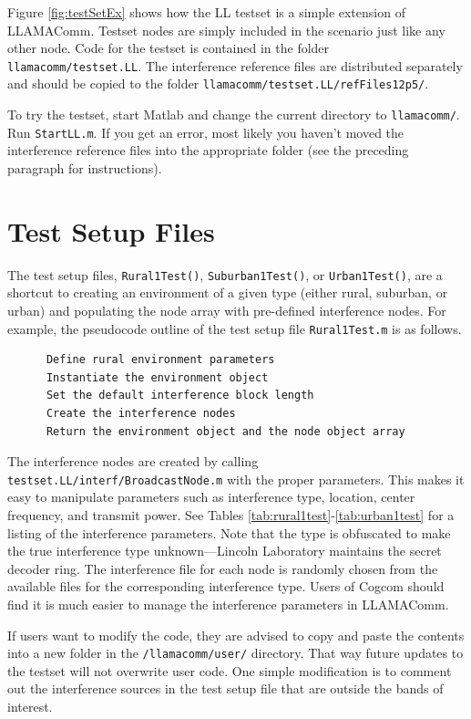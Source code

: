 Figure \ref{fig:testSetEx} shows how the LL testset is a simple
extension of LLAMAComm.  Testset nodes are simply included in the
scenario just like any other node.  Code for the testset is
contained in the folder \verb+llamacomm/testset.LL+. The
interference reference files are distributed separately and should
be copied to the folder \verb+llamacomm/testset.LL/refFiles12p5/+.

To try the testset, start Matlab and change the current directory to
\verb+llamacomm/+.  Run \verb+StartLL.m+.  If you get an error, most
likely you haven't moved the interference reference files into the
appropriate folder (see the preceding paragraph for instructions).

\section{Test Setup Files}
The test setup files, \verb+Rural1Test()+, \verb+Suburban1Test()+, or
\verb+Urban1Test()+, are a shortcut to creating an environment of a given type
(either rural, suburban, or urban) and populating the node array with
pre-defined interference nodes.  For example, the pseudocode outline of the
test setup file \verb+Rural1Test.m+ is as follows.

\begin{verbatim}
      Define rural environment parameters
      Instantiate the environment object
      Set the default interference block length
      Create the interference nodes
      Return the environment object and the node object array
\end{verbatim}

The interference nodes are created by calling
\verb+testset.LL/interf/BroadcastNode.m+ with the proper parameters.
This makes it easy to manipulate parameters such as interference
type, location, center frequency, and transmit power. See Tables
\ref{tab:rural1test}-\ref{tab:urban1test} for a listing of the
interference parameters.  Note that the type is obfuscated to make
the true interference type unknown---Lincoln Laboratory maintains
the secret decoder ring.  The interference file for each node is
randomly chosen from the available files for the corresponding
interference type.  Users of Cogcom should find it is much easier to
manage the interference parameters in LLAMAComm.

If users want to modify the code, they are advised to copy and paste the
contents into a new folder in the \verb+/llamacomm/user/+ directory.  That way
future updates to the testset will not overwrite user code.  One simple
modification is to comment out the interference sources in the test setup file
that are outside the bands of interest.

